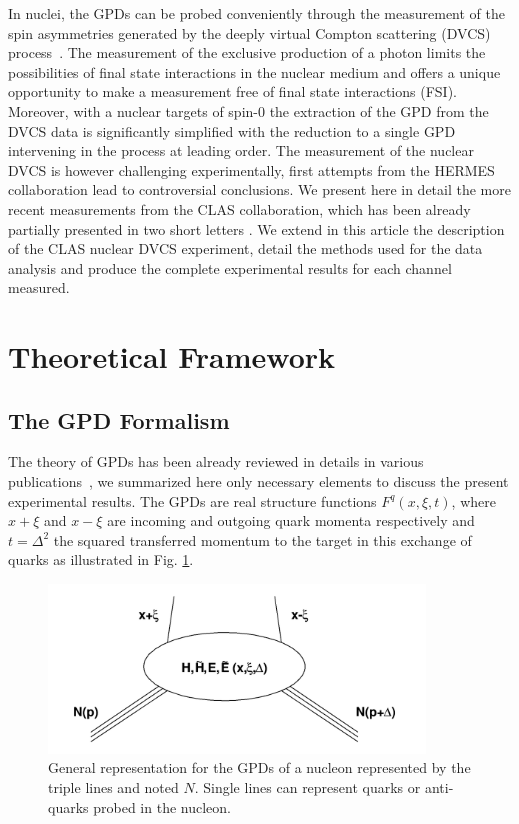 \documentclass[aps,prc,preprint,superscriptaddress]{revtex4}
\begin{document}
In nuclei, the GPDs can be probed conveniently through the measurement of the
spin asymmetries generated by the deeply virtual Compton scattering (DVCS) 
process~\cite{Diehl:2003ny,Belitsky:2005qn,Boffi:2007yc,Guidal:2013rya}. The measurement of the exclusive
production of a photon limits the possibilities of final state interactions in the nuclear 
medium and offers a unique opportunity to make a measurement free of final state interactions 
(FSI). Moreover, with a nuclear targets of spin-0 the extraction of the GPD from the DVCS data 
is significantly simplified with the reduction to a single GPD intervening in the process at leading order. The 
measurement of the nuclear DVCS is however challenging experimentally, first attempts from 
the HERMES collaboration \cite{Airapetian:2009cga} lead to controversial conclusions. We present here
in detail the more recent measurements from the CLAS collaboration, which has been already partially presented
in two short letters \cite{Hattawy:2017woc,Hattawy:2018liu}. We extend in this article 
the description of the CLAS nuclear DVCS experiment, detail the methods used for the
data analysis and produce the complete experimental results for each channel measured.


\section{Theoretical Framework}

\subsection{The GPD Formalism}

The theory of GPDs has been already reviewed in details in various 
publications~\cite{Diehl:2003ny,Belitsky:2005qn,Boffi:2007yc,Guidal:2013rya},
we summarized here only necessary elements to discuss the present experimental results.
The GPDs are real structure functions $F^{q}(x,\xi,t)$, where $x+\xi$ and $x-\xi$ are incoming and outgoing quark momenta 
respectively and $t=\Delta^2$ the squared transferred momentum to the target in this exchange of quarks as illustrated in 
Fig. \ref{fig:GPD}. 

\begin{figure}[tbp!]
\center
\includegraphics[width=10.0cm]{fig1/GPD.png}
\caption{General representation for the GPDs of a nucleon represented by the triple lines and noted $N$.
	Single lines can represent quarks or anti-quarks probed in the nucleon.}
\label{fig:GPD}
\end{figure}
\end{document}
